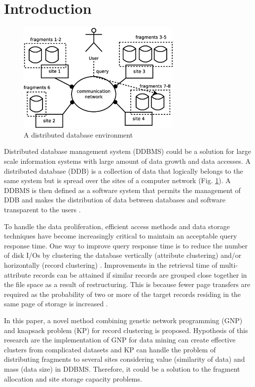 \documentclass{elsart}
\begin{document}

\section{Introduction}

\begin{figure}[tb]
\begin{center}
\includegraphics[width=8cm]{images/ddbms}
\caption{\label{ddbms} A distributed database environment}
\end{center}
\end{figure}

Distributed database management system (DDBMS) could be a solution for large scale information systems with large amount of data growth and data accesses. A distributed database (DDB) is a collection of data that logically belongs to the same system but is spread over the sites of a computer network (Fig. \ref{ddbms}). A DDBMS is then defined as a software system that permits the management of DDB and makes the distribution of data between databases and software transparent to the users \cite{horizontalfragmentation,horizontalfragmentation1}.

To handle the data proliferation, efficient access methods and data storage techniques have become increasingly critical to maintain an acceptable query response time. One way to improve query response time is to reduce the number of disk I/Os by clustering the database vertically (attribute clustering) and/or horizontally (record clustering) \cite{recordclustering,recordclustering1}. Improvements in the retrieval time of multi-attribute records can be attained if similar records are grouped close together in the file space as a result of restructuring. This is because fewer page transfers are required as the probability of two or more of the target records residing in the same page of storage is increased \cite{recordclustering2}.

In this paper, a novel method combining genetic network programming (GNP) \cite{gnp1,gnp2} and knapsack problem (KP) \cite{knapsack2,knapsack3} for record clustering is proposed. Hypothesis of this research are the implementation of GNP for data mining can create effective clusters from complicated datasets and KP can handle the problem of distributing fragments to several sites considering value (similarity of data) and mass (data size) in DDBMS. Therefore, it could be a solution to the fragment allocation and site storage capacity problems.
\end{document}
